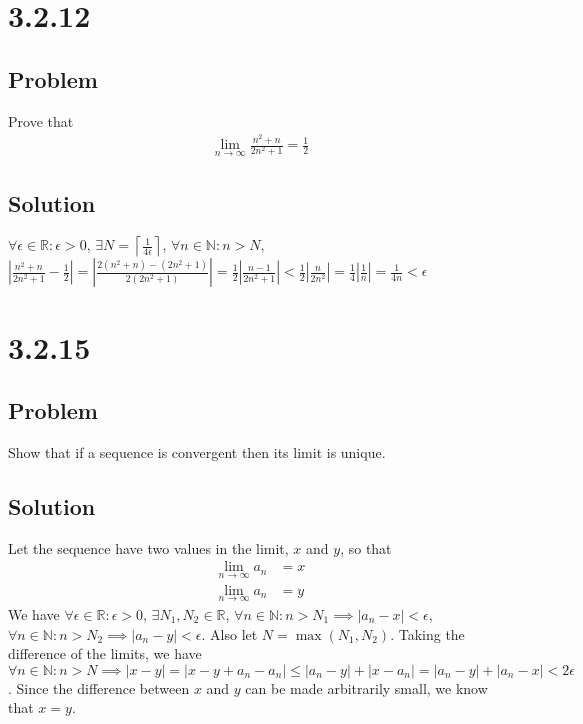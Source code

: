 \documentclass[12pt]{article}
\newcommand{\abs}  [1]{\left|       #1 \right|      }
\newcommand{\ceil} [1]{\left\lceil  #1 \right\rceil }
\newcommand{\R}    [0]{\mathbb{R}                   }
\newcommand{\N}    [0]{\mathbb{N}                   }
\begin{document}
\section*{3.2.12}

\subsection*{Problem}
Prove that
\begin{align*}
    \lim_{n \to \infty} \frac{n^2 + n}{2n^2 + 1} = \frac{1}{2}
\end{align*}

\subsection*{Solution}
$\forall \epsilon \in \R : \epsilon > 0$, $\exists N = \ceil{\frac{1}{4 \epsilon}}$, $\forall n \in \N : n > N$, $\abs{\frac{n^2 + n}{2n^2 + 1} - \frac{1}{2}} = \abs{\frac{2(n^2 + n) - (2n^2 + 1)}{2(2n^2 + 1)}} = \frac{1}{2} \abs{\frac{n - 1}{2n^2 + 1}} < \frac{1}{2} \abs{\frac{n}{2n^2}} = \frac{1}{4} \abs{\frac{1}{n}} = \frac{1}{4n} < \epsilon$



\section*{3.2.15}

\subsection*{Problem}
Show that if a sequence is convergent then its limit is unique.

\subsection*{Solution}
Let the sequence have two values in the limit, $x$ and $y$, so that
\begin{align*}
    \lim_{n \to \infty} a_n &= x \\
    \lim_{n \to \infty} a_n &= y
\end{align*}
 We have $\forall \epsilon \in \R : \epsilon > 0$, $\exists N_1, N_2 \in \R$, $\forall n \in \N : n > N_1 \implies \abs{a_n - x} < \epsilon$, $\forall n \in \N : n > N_2 \implies \abs{a_n - y} < \epsilon$. Also let $N = \max(N_1, N_2)$. Taking the difference of the limits, we have $\forall n \in \N : n > N \implies \abs{x - y} = \abs{x - y + a_n - a_n} \leq \abs{a_n - y} + \abs{x - a_n} = \abs{a_n - y} + \abs{a_n - x} < 2 \epsilon$. Since the difference between $x$ and $y$ can be made arbitrarily small, we know that $x = y$.
\end{document}
